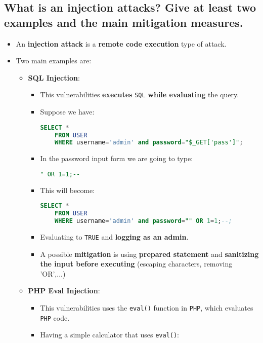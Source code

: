 \documentclass[9pt, letterpaper]{article}
\begin{document}
\subsection{What is an injection attacks? Give at least two examples and the main mitigation measures.}
\begin{itemize}
	\item An \textbf{injection attack} is a \textbf{remote code execution} type of attack.
	\item Two main examples are:
	      \begin{itemize}
		      \item \textbf{SQL Injection}:
		            \begin{itemize}
			            \item This vulnerabilities \textbf{executes} {\tt SQL} \textbf{while evaluating} the query.
			            \item Suppose we have:
			                  \begin{lstlisting}[language=SQL, xrightmargin=0.07\textwidth]
	SELECT * 
	FROM USER 
	WHERE username='admin' and password="$_GET['pass']";
\end{lstlisting}
			            \item In the password input form we are going to type:
			                  \begin{lstlisting}[language=SQL]
	" OR 1=1;--
\end{lstlisting}
			            \item This will become:
			                  \begin{lstlisting}[language=SQL, xrightmargin=0.1\textwidth]
	SELECT * 
	FROM USER 
	WHERE username='admin' and password="" OR 1=1;--;
\end{lstlisting}
			            \item Evaluating to {\tt TRUE} and \textbf{logging as an admin}.
			            \item A possible \textbf{mitigation} is using \textbf{prepared statement} and \textbf{sanitizing the input before executing} (escaping characters, removing 'OR',...)
		            \end{itemize}
		      \item \textbf{PHP Eval Injection}:
		            \begin{itemize}
			            \item This vulnerabilities uses the {\tt eval()} function in {\tt PHP}, which evaluates {\tt PHP} code.
			            \item Having a simple calculator that uses {\tt eval()}:

\end{itemize}
\end{itemize}
\end{itemize}
\end{document}
